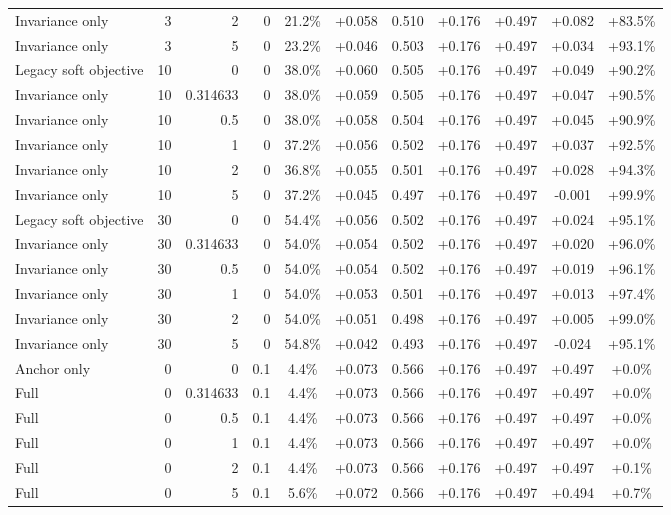 \begin{table}[htbp]
\begin{tabular}{lrrrccccccc}
Invariance only & 3 & 2 & 0 & 21.2\% & +0.058 & 0.510 & +0.176 & +0.497 & +0.082 & +83.5\% \\
Invariance only & 3 & 5 & 0 & 23.2\% & +0.046 & 0.503 & +0.176 & +0.497 & +0.034 & +93.1\% \\
Legacy soft objective & 10 & 0 & 0 & 38.0\% & +0.060 & 0.505 & +0.176 & +0.497 & +0.049 & +90.2\% \\
Invariance only & 10 & 0.314633 & 0 & 38.0\% & +0.059 & 0.505 & +0.176 & +0.497 & +0.047 & +90.5\% \\
Invariance only & 10 & 0.5 & 0 & 38.0\% & +0.058 & 0.504 & +0.176 & +0.497 & +0.045 & +90.9\% \\
Invariance only & 10 & 1 & 0 & 37.2\% & +0.056 & 0.502 & +0.176 & +0.497 & +0.037 & +92.5\% \\
Invariance only & 10 & 2 & 0 & 36.8\% & +0.055 & 0.501 & +0.176 & +0.497 & +0.028 & +94.3\% \\
Invariance only & 10 & 5 & 0 & 37.2\% & +0.045 & 0.497 & +0.176 & +0.497 & -0.001 & +99.9\% \\
Legacy soft objective & 30 & 0 & 0 & 54.4\% & +0.056 & 0.502 & +0.176 & +0.497 & +0.024 & +95.1\% \\
Invariance only & 30 & 0.314633 & 0 & 54.0\% & +0.054 & 0.502 & +0.176 & +0.497 & +0.020 & +96.0\% \\
Invariance only & 30 & 0.5 & 0 & 54.0\% & +0.054 & 0.502 & +0.176 & +0.497 & +0.019 & +96.1\% \\
Invariance only & 30 & 1 & 0 & 54.0\% & +0.053 & 0.501 & +0.176 & +0.497 & +0.013 & +97.4\% \\
Invariance only & 30 & 2 & 0 & 54.0\% & +0.051 & 0.498 & +0.176 & +0.497 & +0.005 & +99.0\% \\
Invariance only & 30 & 5 & 0 & 54.8\% & +0.042 & 0.493 & +0.176 & +0.497 & -0.024 & +95.1\% \\
Anchor only & 0 & 0 & 0.1 & 4.4\% & +0.073 & 0.566 & +0.176 & +0.497 & +0.497 & +0.0\% \\
Full & 0 & 0.314633 & 0.1 & 4.4\% & +0.073 & 0.566 & +0.176 & +0.497 & +0.497 & +0.0\% \\
Full & 0 & 0.5 & 0.1 & 4.4\% & +0.073 & 0.566 & +0.176 & +0.497 & +0.497 & +0.0\% \\
Full & 0 & 1 & 0.1 & 4.4\% & +0.073 & 0.566 & +0.176 & +0.497 & +0.497 & +0.0\% \\
Full & 0 & 2 & 0.1 & 4.4\% & +0.073 & 0.566 & +0.176 & +0.497 & +0.497 & +0.1\% \\
Full & 0 & 5 & 0.1 & 5.6\% & +0.072 & 0.566 & +0.176 & +0.497 & +0.494 & +0.7\% \\

\end{tabular}
\end{table}
